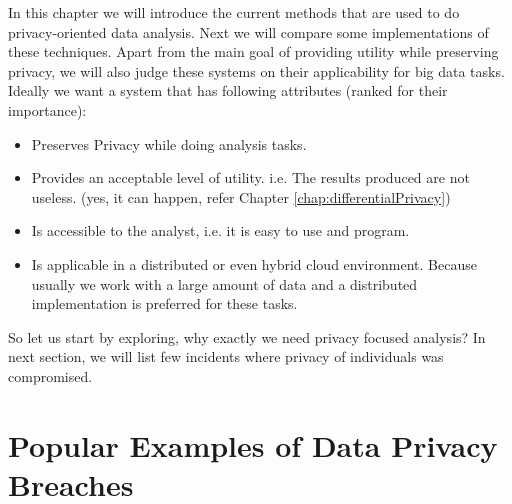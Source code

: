 \documentclass[12pt]{report}
\theoremstyle{named}
\begin{document}
In this chapter we will introduce the current methods that are used to do privacy-oriented data analysis. Next we will compare some implementations of these techniques. Apart from the main goal of providing utility while preserving privacy, we will also judge these systems on their applicability for big data tasks. Ideally we want a system that has following attributes (ranked for their importance):
\begin{itemize}
  \item Preserves Privacy while doing analysis tasks.
  \item Provides an acceptable level of utility. i.e. The results produced are not useless. (yes, it can happen, refer Chapter \ref{chap:differentialPrivacy})
  \item Is accessible to the analyst, i.e. it is easy to use and program.
  \item Is applicable in a distributed or even hybrid cloud environment. Because usually we work with a large amount of data and a distributed implementation is preferred for these tasks.
\end{itemize}

So let us start by exploring, why exactly we need privacy focused analysis? In next section, we will list few incidents where privacy of individuals was compromised.


\section{Popular Examples of Data Privacy Breaches}
\end{document}

